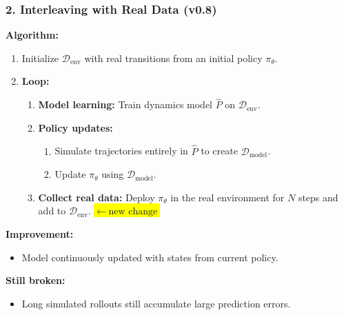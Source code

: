 \documentclass[12pt]{article}
\begin{document}
\subsubsection*{2. Interleaving with Real Data (v0.8)}
\textbf{Algorithm:}
\begin{enumerate}
    \item Initialize $\mathcal{D}_{\text{env}}$ with real transitions from an initial policy $\pi_\theta$.
    \item \textbf{Loop:}
    \begin{enumerate}
        \item \textbf{Model learning:} Train dynamics model $\hat{P}$ on $\mathcal{D}_{\text{env}}$.
        \item \textbf{Policy updates:}
        \begin{enumerate}
            \item Simulate trajectories entirely in $\hat{P}$ to create $\mathcal{D}_{\text{model}}$.
            \item Update $\pi_\theta$ using $\mathcal{D}_{\text{model}}$.
        \end{enumerate}
        \item \textbf{Collect real data:} Deploy $\pi_\theta$ in the real environment for $N$ steps and add to $\mathcal{D}_{\text{env}}$. \colorbox{yellow}{\(\leftarrow\ \text{new change}\)}
    \end{enumerate}
\end{enumerate}


\textbf{Improvement:}
\begin{itemize}
    \item Model continuously updated with states from current policy.
\end{itemize}
\textbf{Still broken:}
\begin{itemize}
    \item Long simulated rollouts still accumulate large prediction errors.
\end{itemize}
\end{document}

